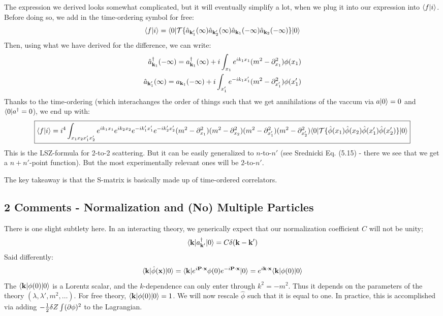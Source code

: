 The expression we derived looks somewhat complicated, but it will eventually simplify a lot, when we plug it into our expression into $\langle f \lvert i \rangle$. Before doing so, we add in the time-ordering symbol for free:
\begin{equation}
    \langle f \lvert i \rangle = \langle 0 \rvert\mathcal{T}\{\hat{a}_{\mathbf{k}_1'}(\infty)\hat{a}_{\mathbf{k}_2'}(\infty)\hat{a}_{\mathbf{k}_1}(-\infty)\hat{a}_{\mathbf{k}_2}(-\infty)\}\lvert 0 \rangle
\end{equation}
Then, using what we have derived for the difference, we can write:
\begin{equation}
    \begin{split}
        \hat{a}^\dagger_{\mathbf{k}_1}(-\infty) = a_{\mathbf{k}_1}^\dagger(\infty) + i\int_{x_1}e^{ik_1x_1}(m^2 - \partial_{x_1}^2)\phi(x_1)
        \\ \hat{a}_{\mathbf{k}'_1}(\infty) = a_{\mathbf{k}_1}(-\infty) + i\int_{x_1'}e^{-ik_1x_1'}(m^2 - \partial_{x_1'}^2)\phi(x_1')
    \end{split}
\end{equation}
Thanks to the time-ordering (which interachanges the order of things such that we get annihilations of the vaccum via $a\lvert 0 \rangle = 0$ and $\langle 0 \rvert a^\dagger = 0$), we end up with:
\begin{equation}
    \boxed{\langle f \lvert i \rangle = i^4\int_{x_1x_2x_1'x_2'}e^{ik_1x_1}e^{ik_2x_2}e^{-ik_1'x_1'}e^{-ik_2'x_2'}(m^2 - \partial_{x_1}^2)(m^2 - \partial_{x_2}^2)(m^2 - \partial_{x_1'}^2)(m^2 - \partial_{x_2'}^2)\langle 0 \rvert\mathcal{T}\{\hat{\phi}(x_1)\hat{\phi}(x_2)\hat{\phi}(x_1')\hat{\phi}(x_2')\}\lvert 0 \rangle}
\end{equation}
This is the LSZ-formula for 2-to-2 scattering. But it can be easily generalized to $n$-to-$n'$ (see Srednicki Eq. (5.15) - there we see that we get a $n + n'$-point function). But the most experimentally relevant ones will be $2$-to-$n'$.

The key takeaway is that the S-matrix is basically made up of time-ordered correlators.

\subsection{2 Comments - Normalization and (No) Multiple Particles}
There is one slight subtlety here. In an interacting theory, we generically expect that our normalization coefficient $C$ will not be unity;
\begin{equation}
    \langle \mathbf{k} \rvert a_{\mathbf{k}'}^\dagger\lvert 0 \rangle = C\delta(\mathbf{k} - \mathbf{k}')
\end{equation}
Said differently:
\begin{equation}
    \langle \mathbf{k} \rvert\hat{\phi}(\mathbf{x})\lvert 0 \rangle = \langle \mathbf{k} \rvert e^{i\mathbf{P} \cdot \mathbf{x}}\phi(0)e^{-i\mathbf{P}\cdot\mathbf{x}}\lvert 0 \rangle = e^{i\mathbf{k}\cdot\mathbf{x}}\langle \mathbf{k} \rvert\phi(0)\lvert 0 \rangle
\end{equation}
The $\langle \mathbf{k} \rvert\phi(0)\lvert 0 \rangle$ is a Lorentz scalar, and the $k$-dependence can only enter through $k^2 = -m^2$. Thus it depends on the parameters of the theory $(\lambda, \lambda', m^2, \ldots)$. For free theory, $\langle \mathbf{k} \rvert\phi(0)\lvert 0 \rangle = 1$. We will now rescale $\hat{\phi}$ such that it is equal to one. In practice, this is accomplished via adding $-\frac{1}{2}\delta Z\int (\partial\phi)^2$ to the Lagrangian.

